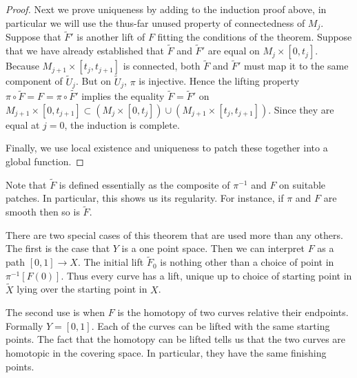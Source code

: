 \begin{proof}
Next we prove uniqueness by adding to the induction proof above, in particular we will use the thus-far unused property of connectedness of $M_j$.
Suppose that $\tilde{F}'$ is another lift of $F$ fitting the conditions of the theorem.
Suppose that we have already established that $\tilde{F}$ and $\tilde{F}'$ are equal on $M_j \times [0,t_j]$.
Because $M_{j+1} \times [t_j, t_{j+1}]$ is connected, both $\tilde{F}$ and $\tilde{F}'$ must map it to the same component of $\tilde{U}_j$.
But on $\tilde{U}_j$, $\pi$ is injective.
Hence the lifting property $\pi \circ \tilde{F} = F = \pi \circ \tilde{F'}$ implies the equality $\tilde{F} = \tilde{F}'$ on $M_{j+1} \times [0,t_{j+1}] \subset (M_{j} \times [0,t_{j}]) \cup (M_{j+1} \times [t_j,t_{j+1}])$.
Since they are equal at $j=0$, the induction is complete.

Finally, we use local existence and uniqueness to patch these together into a global function.
\end{proof}

Note that $\tilde{F}$ is defined essentially as the composite of $\pi^{-1}$ and $F$ on suitable patches.
In particular, this shows us its regularity.
For instance, if $\pi$ and $F$ are smooth then so is $\tilde{F}$.

There are two special cases of this theorem that are used more than any others.
The first is the case that $Y$ is a one point space.
Then we can interpret $F$ as a path $[0,1] \to X$.
The initial lift $\tilde{F}_0$ is nothing other than a choice of point in $\pi^{-1}[F(0)]$.
Thus every curve has a lift, unique up to choice of starting point in $\tilde{X}$ lying over the starting point in $X$.

The second use is when $F$ is the homotopy of two curves relative their endpoints.
Formally $Y = [0,1]$.
Each of the curves can be lifted with the same starting points.
The fact that the homotopy can be lifted tells us that the two curves are homotopic in the covering space.
In particular, they have the same finishing points. 


